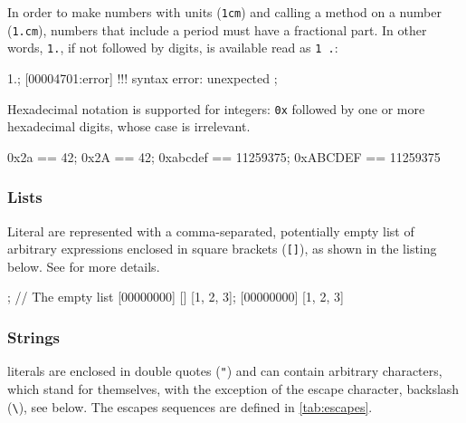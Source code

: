 In order to make numbers with units (\lstinline|1cm|) and calling a
method on a number (\lstinline|1.cm|), numbers that include a period
must have a fractional part.  In other words, \lstinline|1.|, if not
followed by digits, is available read as \lstinline|1 .|:

\begin{urbiscript}
1.;
[00004701:error] !!! syntax error: unexpected ;
\end{urbiscript}

Hexadecimal notation is supported for integers: \lstinline|0x|
followed by one or more hexadecimal digits, whose case is irrelevant.

\begin{urbiassert}
    0x2a == 42;
    0x2A == 42;
0xabcdef == 11259375;
0xABCDEF == 11259375
\end{urbiassert}

\subsubsection{Lists}
\label{sec:us-syn-lit-list}

Literal  are represented with a comma-separated, potentially
empty list of arbitrary expressions enclosed in square brackets
(\lstinline|[]|), as shown in the listing below.  See
 for more details.

\begin{urbiscript}
[]; // The empty list
[00000000] []
[1, 2, 3];
[00000000] [1, 2, 3]
\end{urbiscript}

\subsubsection{Strings}
\label{sec:us-syn-lit-string}

 literals are enclosed in double quotes (\lstinline|"|)
and can contain arbitrary characters, which stand for themselves, with
the exception of the escape character, backslash (\lstinline|\|), see
below.  The escapes sequences are defined in \autoref{tab:escapes}.


